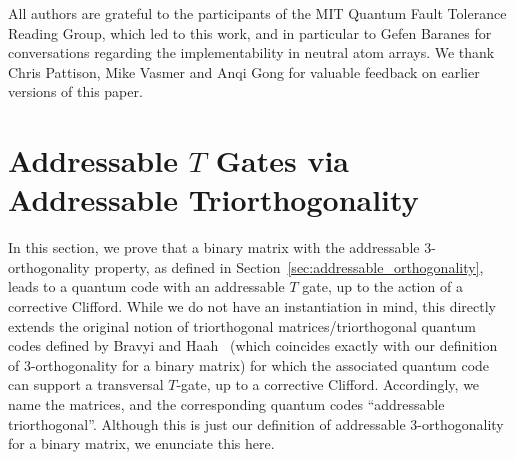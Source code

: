 \documentclass[11pt]{article}
\theoremstyle{definition}
\begin{document}
All authors are grateful to the participants of the MIT Quantum Fault Tolerance Reading Group, which led to this work, and in particular to Gefen Baranes for conversations regarding the implementability in neutral atom arrays.
We thank Chris Pattison, Mike Vasmer and Anqi Gong for valuable feedback on earlier versions of this paper.





\appendix

\section{Addressable \texorpdfstring{$T$}{} Gates via Addressable Triorthogonality}\label{sec:transversal_T}
In this section, we prove that a binary matrix with the addressable 3-orthogonality property, as defined in Section~\ref{sec:addressable_orthogonality}, leads to a quantum code with an addressable $T$ gate, up to the action of a corrective Clifford. While we do not have an instantiation in mind, this directly extends the original notion of triorthogonal matrices/triorthogonal quantum codes defined by Bravyi and Haah~\cite{bravyi2012magic} (which coincides exactly with our definition of 3-orthogonality for a binary matrix) for which the associated quantum code can support a transversal $T$-gate, up to a corrective Clifford. Accordingly, we name the matrices, and the corresponding quantum codes ``addressable triorthogonal''. Although this is just our definition of addressable 3-orthogonality for a binary matrix, we enunciate this here.
\end{document}
